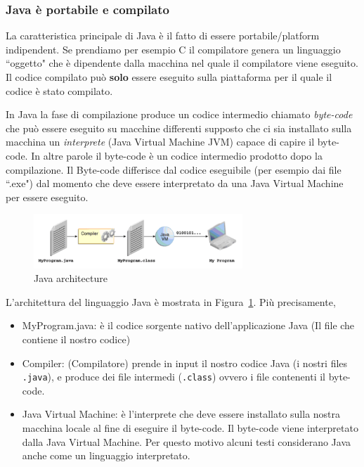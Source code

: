 \documentclass{article}
\theoremstyle{definition}
\begin{document}
\subsubsection{Java \`e portabile e compilato}
La caratteristica principale di Java \`e il fatto di essere portabile/platform indipendent. 
Se prendiamo per esempio C il compilatore genera un linguaggio ``oggetto" che \`e dipendente dalla macchina nel quale il compilatore viene eseguito. 
Il codice compilato pu\`o \textbf{solo} essere eseguito sulla piattaforma per il quale il codice \`e stato compilato.

In Java la fase di compilazione produce un codice intermedio chiamato \emph{byte-code} che pu\`o essere eseguito su macchine differenti supposto che ci sia installato sulla macchina un \emph{interprete} (Java Virtual Machine JVM) capace di capire il byte-code. 
In altre parole il byte-code \`e un codice intermedio prodotto dopo la compilazione. Il Byte-code differisce dal codice eseguibile (per esempio dai file ``.exe") dal momento che deve essere interpretato da una  Java Virtual Machine per essere eseguito.

\begin{figure}[h]
\centering
    \includegraphics[width=0.7\textwidth]{Img/jvm-architecture.png}
    \caption{Java architecture}
    \label{JavaArchitecture}
\end{figure}

L'architettura del linguaggio Java \`e mostrata in Figura~\ref{JavaArchitecture}. Pi\`u precisamente,

\begin{itemize}
\item MyProgram.java: \`e il codice sorgente nativo dell'applicazione Java (Il file che contiene il nostro codice)
\item Compiler: (Compilatore) prende in input il nostro codice Java  (i nostri files \texttt{.java}), e produce dei file intermedi  (\texttt{.class}) ovvero i file contenenti il byte-code.
\item Java Virtual Machine: \`e l'interprete che deve essere installato sulla nostra macchina locale al fine di eseguire il byte-code. 
Il byte-code viene interpretato dalla Java Virtual Machine. Per questo motivo alcuni testi considerano Java anche come un linguaggio interpretato.
\end{itemize}
\end{document}
